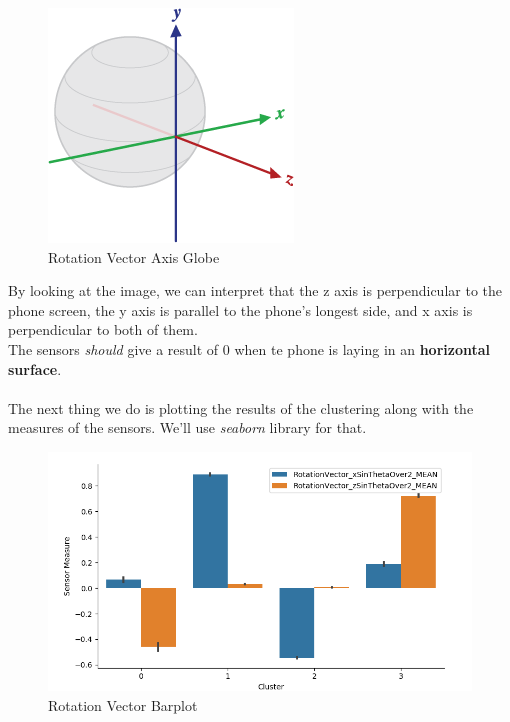 \documentclass[idxtotoc,hyperref,openany]{labbook} %
\begin{document}
\begin{figure}[h]
\includegraphics[width=0.9\linewidth]{sensors/rotationvector_axis_globe.png}
\setlength\belowcaptionskip{-10pt}
\caption{Rotation Vector Axis Globe}
\label{Rotation Vector Axis Globe}
\end{figure}

\clearpage
By looking at the image, we can interpret that the z axis is perpendicular to the phone screen, the y axis is parallel to the phone's longest side, and x axis is perpendicular to both of them.\\
The sensors \textit{should} give a result of 0 when te phone is laying in an \textbf{horizontal surface}.\\\\
The next thing we do is plotting the results of the clustering along with the measures of the sensors. We'll use \textit{seaborn} library for that.

\begin{figure}[h]
\includegraphics[width=0.9\linewidth]{2710/Gyroscope_factorplot.png}
\setlength\belowcaptionskip{-10pt}
\caption{Rotation Vector Barplot}
\label{Rotation Vector Factorplot}
\end{figure}
\end{document}

